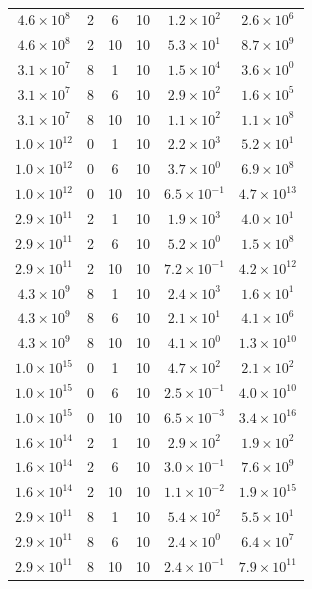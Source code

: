 \documentclass[aps, prd, reprint, nofootinbib]{revtex4-2}
\begin{document}
\begin{appendix}
\begin{table}[h!]
\begin{tabular}{|c|c|c|c|c|c|}
$4.6 \times 10^{8}$ & 2 & 6 & 10 & $1.2 \times 10^{2}$ & $2.6 \times 10^{6}$ \\
$4.6 \times 10^{8}$ & 2 & 10 & 10 & $5.3 \times 10^{1}$ & $8.7 \times 10^{9}$ \\
$3.1 \times 10^{7}$ & 8 & 1 & 10 & $1.5 \times 10^{4}$ & $3.6 \times 10^{0}$ \\
$3.1 \times 10^{7}$ & 8 & 6 & 10 & $2.9 \times 10^{2}$ & $1.6 \times 10^{5}$ \\
$3.1 \times 10^{7}$ & 8 & 10 & 10 & $1.1 \times 10^{2}$ & $1.1 \times 10^{8}$ \\
\hline
$1.0 \times 10^{12}$ & 0 & 1 & 10 & $2.2 \times 10^{3}$ & $5.2 \times 10^{1}$ \\
$1.0 \times 10^{12}$ & 0 & 6 & 10 & $3.7 \times 10^{0}$ & $6.9 \times 10^{8}$ \\
$1.0 \times 10^{12}$ & 0 & 10 & 10 & $6.5 \times 10^{-1}$ & $4.7 \times 10^{13}$ \\
$2.9 \times 10^{11}$ & 2 & 1 & 10 & $1.9 \times 10^{3}$ & $4.0 \times 10^{1}$ \\
$2.9 \times 10^{11}$ & 2 & 6 & 10 & $5.2 \times 10^{0}$ & $1.5 \times 10^{8}$ \\
$2.9 \times 10^{11}$ & 2 & 10 & 10 & $7.2 \times 10^{-1}$ & $4.2 \times 10^{12}$ \\
$4.3 \times 10^{9}$ & 8 & 1 & 10 & $2.4 \times 10^{3}$ & $1.6 \times 10^{1}$ \\
$4.3 \times 10^{9}$ & 8 & 6 & 10 & $2.1 \times 10^{1}$ & $4.1 \times 10^{6}$ \\
$4.3 \times 10^{9}$ & 8 & 10 & 10 & $4.1 \times 10^{0}$ & $1.3 \times 10^{10}$ \\
\hline
$1.0 \times 10^{15}$ & 0 & 1 & 10 & $4.7 \times 10^{2}$ & $2.1 \times 10^{2}$ \\
$1.0 \times 10^{15}$ & 0 & 6 & 10 & $2.5 \times 10^{-1}$ & $4.0 \times 10^{10}$ \\
$1.0 \times 10^{15}$ & 0 & 10 & 10 & $6.5 \times 10^{-3}$ & $3.4 \times 10^{16}$ \\
$1.6 \times 10^{14}$ & 2 & 1 & 10 & $2.9 \times 10^{2}$ & $1.9 \times 10^{2}$ \\
$1.6 \times 10^{14}$ & 2 & 6 & 10 & $3.0 \times 10^{-1}$ & $7.6 \times 10^{9}$ \\
$1.6 \times 10^{14}$ & 2 & 10 & 10 & $1.1 \times 10^{-2}$ & $1.9 \times 10^{15}$ \\
$2.9 \times 10^{11}$ & 8 & 1 & 10 & $5.4 \times 10^{2}$ & $5.5 \times 10^{1}$ \\
$2.9 \times 10^{11}$ & 8 & 6 & 10 & $2.4 \times 10^{0}$ & $6.4 \times 10^{7}$ \\
$2.9 \times 10^{11}$ & 8 & 10 & 10 & $2.4 \times 10^{-1}$ & $7.9 \times 10^{11}$ \\
\hline
\end{tabular}
    \caption{}


\end{table}
\end{appendix}
\end{document}

